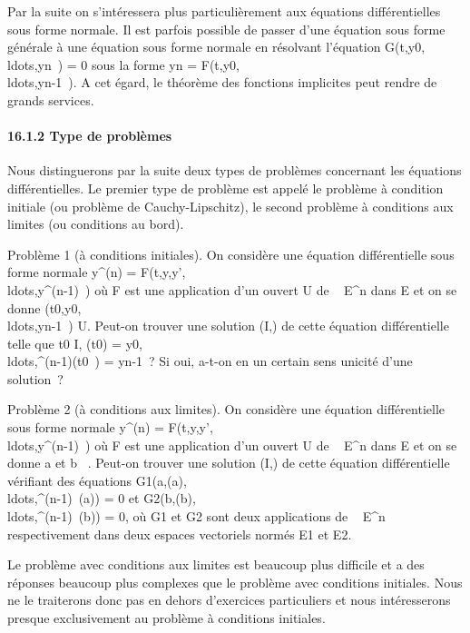 Par la suite on s'intéressera plus particulièrement aux équations
différentielles sous forme normale. Il est parfois possible de passer
d'une équation sous forme générale à une équation sous forme normale en
résolvant l'équation
G(t,y0,\\ldots,yn~)
= 0 sous la forme yn =
F(t,y0,\\ldots,yn-1~).
A cet égard, le théorème des fonctions implicites peut rendre de grands
services.

\paragraph{16.1.2 Type de problèmes}

Nous distinguerons par la suite deux types de problèmes concernant les
équations différentielles. Le premier type de problème est appelé le
problème à condition initiale (ou problème de Cauchy-Lipschitz), le
second problème à conditions aux limites (ou conditions au bord).

Problème 1 (à conditions initiales). On considère une équation
différentielle sous forme normale y^(n) =
F(t,y,y',\\ldots,y^(n-1)~)
où F est une application d'un ouvert U de ~ \times E^n dans E et
on se donne
(t0,y0,\\ldots,yn-1~)
\in U. Peut-on trouver une solution (I,\phi) de cette équation différentielle
telle que t0 \in I, \phi(t0) =
y0,\\ldots,\phi^(n-1)(t0~)
= yn-1~? Si oui, a-t-on en un certain sens unicité d'une
solution~?

Problème 2 (à conditions aux limites). On considère une équation
différentielle sous forme normale y^(n) =
F(t,y,y',\\ldots,y^(n-1)~)
où F est une application d'un ouvert U de ~ \times E^n dans E et
on se donne a et b \in {}~. Peut-on trouver une solution (I,\phi) de cette
équation différentielle vérifiant des équations
G1(a,\phi(a),\\ldots,\phi^(n-1)~(a))
= 0 et
G2(b,\phi(b),\\ldots,\phi^(n-1)~(b))
= 0, où G1 et G2 sont deux applications de ~ \times
E^n respectivement dans deux espaces vectoriels normés
E1 et E2.

Le problème avec conditions aux limites est beaucoup plus difficile et a
des réponses beaucoup plus complexes que le problème avec conditions
initiales. Nous ne le traiterons donc pas en dehors d'exercices
particuliers et nous intéresserons presque exclusivement au problème à
conditions initiales.

